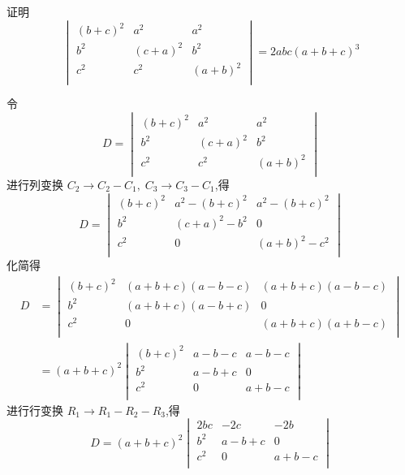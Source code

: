 \begin{questions}
    \question 证明
    \[
    \begin{vmatrix}
    (b+c)^2 & a^2 & a^2 \\
    b^2 & (c+a)^2 & b^2 \\
    c^2 & c^2 & (a+b)^2 \\
    \end{vmatrix}
    = 2abc(a+b+c)^3
    \]
    \begin{solution}
        令
        \[
        D = \begin{vmatrix}
        (b+c)^2 & a^2 & a^2 \\
        b^2 & (c+a)^2 & b^2 \\
        c^2 & c^2 & (a+b)^2 \\
        \end{vmatrix}
        \]
        进行列变换 \( C_2 \rightarrow C_2 - C_1,\; C_3 \rightarrow C_3 - C_1 \),得
        \[
        D = \begin{vmatrix}
        (b+c)^2 & a^2 - (b+c)^2 & a^2 - (b+c)^2 \\
        b^2 & (c+a)^2 - b^2 & 0 \\
        c^2 & 0 & (a+b)^2 - c^2 \\
        \end{vmatrix}
        \]
        化简得
        \begin{align*}
        D &= \begin{vmatrix}
        (b+c)^2 & (a+b+c)(a-b-c) & (a+b+c)(a-b-c) \\
        b^2 & (a+b+c)(a-b+c) & 0 \\
        c^2 & 0 & (a+b+c)(a+b-c) \\
        \end{vmatrix} \\
        &= (a+b+c)^2 \begin{vmatrix}
        (b+c)^2 & a-b-c & a-b-c \\
        b^2 & a-b+c & 0 \\
        c^2 & 0 & a+b-c \\
        \end{vmatrix}
        \end{align*}
        进行行变换 \( R_1 \rightarrow R_1 - R_2 - R_3 \),得
        \[
        D = (a+b+c)^2 \begin{vmatrix}
        2bc & -2c & -2b \\
        b^2 & a-b+c & 0 \\
        c^2 & 0 & a+b-c \\
        \end{vmatrix}
\]
\end{solution}
\end{questions}
